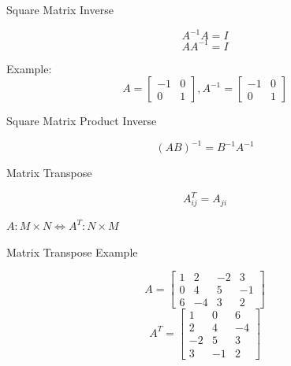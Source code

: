 \documentclass{beamer}
\begin{document}
\begin{frame}{Square Matrix Inverse}

\[ A^{-1}A = I \]
\[ AA^{-1} = I \]

Example:
\[ A = \left[ \begin{array}{cc} -1 & 0 \\ 0 & 1 \end{array} \right], A^{-1} = \left[ \begin{array}{cc} -1 & 0 \\ 0 & 1 \end{array} \right] \]

\end{frame}


\begin{frame}{Square Matrix Product Inverse}

\[ (AB)^{-1} = B^{-1}A^{-1} \]
\end{frame}


\begin{frame}{Matrix Transpose}

\[ A^T_{ij} = A_{ji} \]

$A: M\times N \iff A^T: N\times M$



\end{frame}

\begin{frame}{Matrix Transpose Example}

\[ A = \left[ \begin{array}{cccc} 1 & 2 & -2 & 3 \\ 0 & 4 & 5 & -1 \\ 6 & -4 & 3 & 2 \end{array} \right] \]
\[ A^T = \left[ \begin{array}{ccc} 1 & 0 & 6 \\ 2 & 4 & -4 \\ -2 & 5 & 3 \\ 3 & -1 & 2 \end{array} \right] \]

\end{frame}
\end{document}

